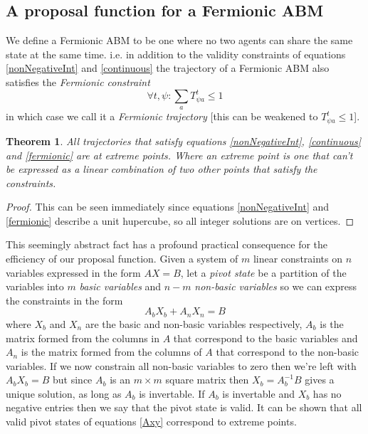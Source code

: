 \documentclass{article}
\newtheorem{theorem}{Theorem}
\begin{document}
\subsection{A proposal function for a Fermionic ABM}

We define a Fermionic ABM to be one where no two agents can share the same state at the same time. i.e. in addition to the validity constraints of equations \ref{nonNegativeInt} and \ref{continuous} the trajectory of a Fermionic ABM also satisfies the \textit{Fermionic constraint}
\begin{equation}
\forall t,\psi: \sum_a T^t_{\psi a} \le 1
\label{fermionic}
\end{equation}
in which case we call it a \textit{Fermionic trajectory} [this can be weakened to $T^t_{\psi a} \le 1$].

\begin{theorem}
All trajectories that satisfy equations \ref{nonNegativeInt}, \ref{continuous} and \ref{fermionic} are at extreme points. Where an extreme point is one that can't be expressed as a linear combination of two other points that satisfy the constraints.
\end{theorem}
\begin{proof}
This can be seen immediately since equations \ref{nonNegativeInt} and \ref{fermionic} describe a unit hupercube, so all integer solutions are on vertices.
\end{proof}


This seemingly abstract fact has a profound practical consequence for the efficiency of our proposal function.
Given a system of $m$ linear constraints on $n$ variables expressed in the form $AX=B$, let a \textit{pivot state} be a partition of the variables into $m$ \textit{basic variables} and $n-m$ \textit{non-basic variables} so we can express the constraints in the form
\begin{equation}
A_bX_b + A_nX_n = B
\label{tableau1}
\end{equation}
where $X_b$ and $X_n$ are the basic and non-basic variables respectively, $A_b$ is the matrix formed from the columns in $A$ that correspond to the basic variables and $A_n$ is the matrix formed from the columns of $A$ that correspond to the non-basic variables. If we now constrain all non-basic variables to zero then we're left with $A_bX_b = B$ but since $A_b$ is an $m \times m$ square matrix then $X_b = A_b^{-1}B$ gives a unique solution, as long as $A_b$ is invertable. If $A_b$ is invertable and $X_b$ has no negative entries then we say that the pivot state is valid. It can be shown that all valid pivot states of equations \ref{Axy} correspond to extreme points\cite{dantzig1955generalized}.
\end{document}
